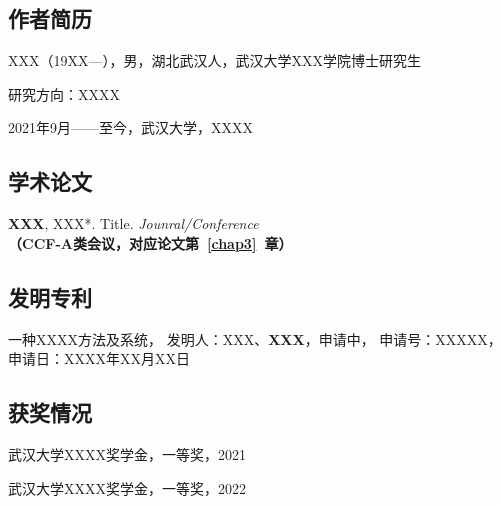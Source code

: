 %
%

\reseachresult

\subsection*{作者简历}

XXX（19XX—），男，湖北武汉人，武汉大学XXX学院博士研究生

研究方向：XXXX

2021年9月——至今，武汉大学，XXXX

\subsection*{学术论文}
\begin{enumerate}[{[}1{]}]

\item \textbf{XXX}, XXX*.
Title.
\textit{Jounral/Conference}\\
\textbf{（CCF-A类会议，对应论文第~\ref{chap3}~章）}
\end{enumerate}

\subsection*{发明专利}
\begin{enumerate}[{[}1{]}]
\item 一种XXXX方法及系统，
发明人：XXX、\textbf{XXX}，申请中，
申请号：XXXXX，申请日：XXXX年XX月XX日
\end{enumerate}

\subsection*{获奖情况}
\begin{enumerate}[{[}1{]}]
\item 武汉大学XXXX奖学金，一等奖，2021
\item 武汉大学XXXX奖学金，一等奖，2022
\end{enumerate}

\acknowledgement

  \iflib
  \else
  \newpage
  \cleardoublepage
  \fi
